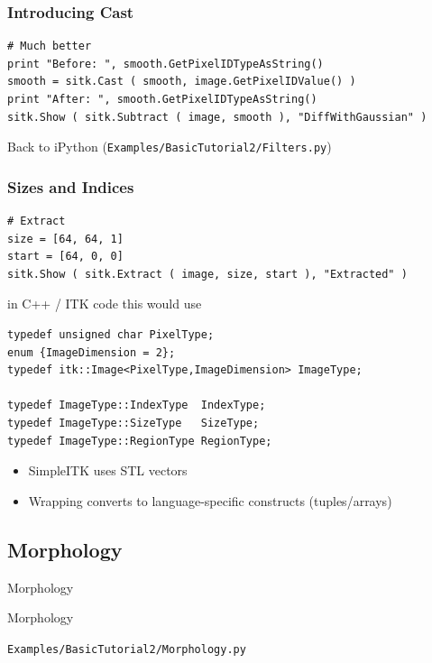 \begin{frame}[fragile]
\frametitle{Introducing Cast}
\lstpython
\begin{lstlisting}
# Much better
print "Before: ", smooth.GetPixelIDTypeAsString()
smooth = sitk.Cast ( smooth, image.GetPixelIDValue() )
print "After: ", smooth.GetPixelIDTypeAsString()
sitk.Show ( sitk.Subtract ( image, smooth ), "DiffWithGaussian" )
\end{lstlisting}
Back to iPython (\texttt{Examples/BasicTutorial2/Filters.py})
\end{frame}


\begin{frame}[fragile]
\frametitle{Sizes and Indices}
\lstpython
\begin{lstlisting}
# Extract
size = [64, 64, 1]
start = [64, 0, 0]
sitk.Show ( sitk.Extract ( image, size, start ), "Extracted" )
\end{lstlisting}
in C++ / ITK code this would use
\lstcpp
\begin{lstlisting}
typedef unsigned char PixelType;
enum {ImageDimension = 2};
typedef itk::Image<PixelType,ImageDimension> ImageType;

typedef ImageType::IndexType  IndexType;
typedef ImageType::SizeType   SizeType;
typedef ImageType::RegionType RegionType;
\end{lstlisting}
\begin{itemize}
\item SimpleITK uses STL vectors
\item Wrapping converts to language-specific constructs (tuples/arrays)
\end{itemize}
\end{frame}


\subsection{Morphology}

\begin{frame}{Morphology}
\fontsize{36pt}{36pt}\selectfont
\center
\begin{center}
Morphology
\end{center}
\vspace{20pt}
\begin{center}
\fontsize{11pt}{11pt}\selectfont
\texttt{Examples/BasicTutorial2/Morphology.py}
\end{center}
\end{frame}

